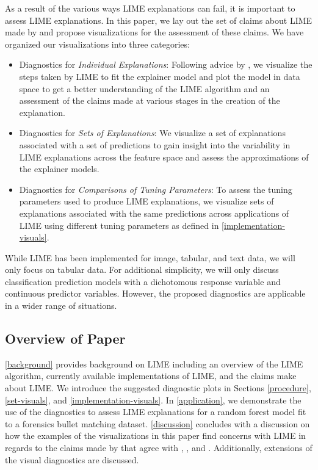 \documentclass[AMS,STIX2COL]{WileyNJD-v2}\usepackage[]{graphicx}\usepackage[]{color}
\begin{document}
As a result of the various ways LIME explanations can fail, it is important to assess LIME explanations. In this paper, we lay out the set of claims about LIME made by \citet{ribeiro:2016} and propose visualizations for the assessment of these claims. We have organized our visualizations into three categories:

\begin{itemize}
\item Diagnostics for \emph{Individual Explanations}: Following advice by \citet{wickham:2015}, we visualize the steps taken by LIME to fit the explainer model and plot the model in data space to get a better understanding of the LIME algorithm and an assessment of the claims made at various stages in the creation of the explanation.
\item Diagnostics for \emph{Sets of Explanations}: We visualize a set of explanations associated with a set of predictions to gain insight into the variability in LIME explanations across the feature space and assess the approximations of the explainer models.
\item Diagnostics for \emph{Comparisons of Tuning Parameters}: To assess the tuning parameters used to produce LIME explanations, we visualize sets of explanations associated with the same predictions across applications of LIME using different tuning parameters as defined in \autoref{implementation-visuals}.
\end{itemize}

While LIME has been implemented for image, tabular, and text data, we will only focus on tabular data. For additional simplicity, we will only discuss classification prediction models with a dichotomous response variable and continuous predictor variables. However, the proposed diagnostics are applicable in a wider range of situations.

\subsection{Overview of Paper}

\autoref{background} provides background on LIME including an overview of the LIME algorithm, currently available implementations of LIME, and the claims \citet{ribeiro:2016} make about LIME. We introduce the suggested diagnostic plots in Sections \ref{procedure}, \ref{set-visuals}, and \ref{implementation-visuals}. In \autoref{application}, we  demonstrate the use of the diagnostics to assess LIME explanations for a random forest model fit to a forensics bullet matching dataset. \autoref{discussion} concludes with a discussion on how the examples of the visualizations in this paper find concerns with LIME in regards to the claims made by \citet{ribeiro:2016} that agree with \citet{alvarezmelis:2018}, \citet{laugel:2018}, and \citet{molnar:2019}. Additionally, extensions of the visual diagnostics are discussed.
\end{document}
